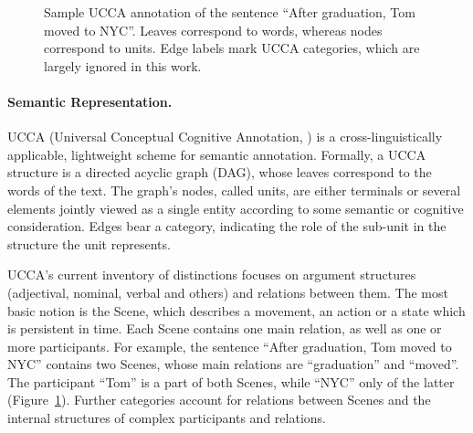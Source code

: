 \documentclass[11pt]{article}
\newcommand{\figref}[1]{Figure~\ref{#1}}
\def\inparcite#1{\newcite{#1}}
\begin{document}
\begin{figure}

\caption{\label{fig:ucca_example}
  Sample UCCA annotation of the sentence ``After graduation, Tom moved
  to NYC''. Leaves correspond to words, whereas nodes correspond to units.
  Edge labels mark UCCA categories, which are largely ignored in this work.}
\end{figure}



\paragraph{Semantic Representation.}
UCCA (Universal Conceptual Cognitive Annotation, \inparcite{abend2013universal}) is a
cross-linguistically applicable, lightweight
scheme for semantic annotation. Formally, a UCCA structure is a directed acyclic graph (DAG),
whose leaves correspond to the words of the text.
The graph's nodes, called {\sc units}, are either terminals or several elements jointly
viewed as a single entity according to some semantic or cognitive consideration. Edges bear
a category, indicating the role of the sub-unit in the structure the unit
represents.

UCCA's current inventory of distinctions focuses on argument structures
(adjectival, nominal, verbal and others) and relations between them.
The most basic notion is the Scene, which describes a movement, an
action or a state which is persistent in time. Each Scene contains one main relation, as well
as one or more participants. For example, the sentence ``After graduation, Tom moved to NYC''
contains two Scenes, whose main relations are ``graduation'' and ``moved''.
The participant ``Tom'' is a part of both Scenes, while ``NYC'' only of the
latter (\figref{fig:ucca_example}). Further categories account for
relations between Scenes and the internal structures of complex participants and relations.
\end{document}
